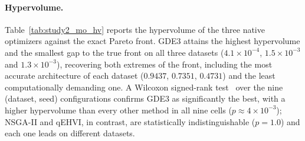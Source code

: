 \paragraph{Hypervolume.}
Table~\ref{tab:study2_mo_hv} reports the hypervolume of the three native optimizers against the exact Pareto front. GDE3 attains the highest hypervolume and the smallest gap to the true front on all three datasets ($4.1 \times 10^{-4}$, $1.5 \times 10^{-3}$ and $1.3 \times 10^{-3}$), recovering both extremes of the front, including the most accurate architecture of each dataset ($0.9437$, $0.7351$, $0.4731$) and the least computationally demanding one. A Wilcoxon signed-rank test~\cite{demsar2006statistical} over the nine (dataset, seed) configurations confirms GDE3 as significantly the best, with a higher hypervolume than every other method in all nine cells ($p \approx 4 \times 10^{-3}$); NSGA-II and qEHVI, in contrast, are statistically indistinguishable ($p = 1.0$) and each one leads on different datasets.

\begin{table}[!ht]
    \centering
    \caption{Multi-objective \acrshort{nas}: mean hypervolume $\pm$ std over $N_{\mathrm{val}}=3$ seeds for the three native optimizers, with the gap to the true Pareto front $(\mathrm{HV}^{\star}-\mathrm{HV})$ in parentheses. The reference point is $R=(1.1,1.1)$; a higher hypervolume, and therefore a smaller gap, is better. The best value per dataset is in bold. The scalarized single-objective baseline is reported in Table~\ref{tab:study2_scalar_hv}.}
    \label{tab:study2_mo_hv}
\end{table}

